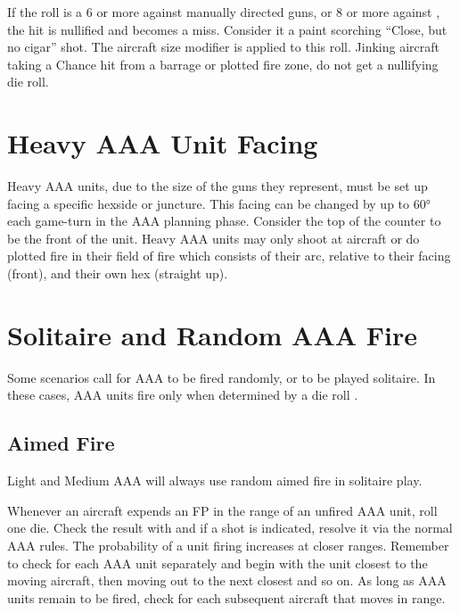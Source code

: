 \begin{advancedrules}
    If the roll is a 6 or more against manually directed guns, or 8 or more against , the hit is nullified and becomes a miss. Consider it a paint scorching “Close, but no cigar” shot. The aircraft size modifier is applied to this roll. Jinking aircraft taking a Chance hit from a barrage or plotted fire zone, do not get a nullifying die roll.

    \section{Heavy AAA Unit Facing}
    \label{rule:heavy-aaa-unit-facing}

    Heavy AAA units, due to the size of the guns they represent, must be set up facing a specific hexside or juncture. This facing can be changed by up to 60° each game-turn in the AAA planning phase. Consider the top of the counter to be the front of the unit. Heavy AAA units may only shoot at aircraft or do plotted fire in their field of fire which consists of their  arc, relative to their facing (front), and their own hex (straight up).

    \section{Solitaire and Random AAA Fire}

    
    

    Some scenarios call for AAA to be fired randomly, or to be played solitaire. In these cases, AAA units fire only when determined by a die roll .

    \subsection{Aimed Fire} Light and Medium AAA will always use random aimed fire in solitaire play.

    Whenever an aircraft expends an FP in the range of an unfired AAA unit, roll one die. Check the result with  and if a shot is indicated, resolve it via the normal AAA rules. The probability of a unit firing increases at closer ranges. Remember to check for each AAA unit separately and begin with the unit closest to the moving aircraft, then moving out to the next closest and so on. As long as AAA units remain to be fired, check for each subsequent aircraft that moves in range.


\end{advancedrules}
